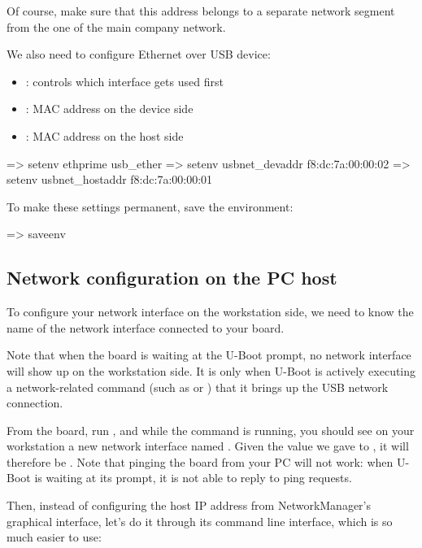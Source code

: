 Of course, make sure that this address belongs to a separate network
segment from the one of the main company network.

We also need to configure Ethernet over USB device:
\begin{itemize}
  \item {}: controls which interface gets used first
  \item {}: MAC address on the device side
  \item {}: MAC address on the host side
\end{itemize}

\begin{ubootinput}
=> setenv ethprime usb_ether
=> setenv usbnet_devaddr f8:dc:7a:00:00:02
=> setenv usbnet_hostaddr f8:dc:7a:00:00:01
\end{ubootinput}

To make these settings permanent, save the environment:

\begin{ubootinput}
=> saveenv
\end{ubootinput}

\subsection{Network configuration on the PC host}

To configure your network interface on the workstation side, we need
to know the name of the network interface connected to your board.

Note that when the board is waiting at the U-Boot prompt, no network
interface will show up on the workstation side. It is only when U-Boot
is actively executing a network-related command (such as 
or ) that it brings up the USB network connection.

From the board, run , and while the 
command is running, you should see on your workstation a new network
interface named . Given the value we gave to
, it will therefore be
. Note that pinging the board from your PC will
not work: when U-Boot is waiting at its prompt, it is not able to
reply to ping requests.

Then, instead of configuring the host IP address from NetworkManager's
graphical interface, let's do it through its command line interface,
which is so much easier to use:

